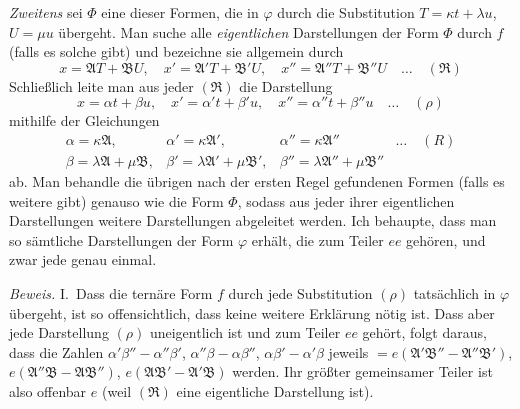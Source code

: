 \textit{Zweitens} sei $\Phi$ eine dieser Formen, die in $\varphi$ durch
die Substitution $T=\kappa t+\lambda u$, $U=\mu u$ übergeht. Man suche alle \textit{eigentlichen}
Darstellungen der Form $\Phi$ durch $f$ (falls es solche gibt)
und bezeichne sie allgemein durch
\[
x=\mathfrak{A}T+\mathfrak{B}U,\quad x'=\mathfrak{A}'T+\mathfrak{B}'U,\quad x''=\mathfrak{A}''T+\mathfrak{B}''U\quad\ldots\quad(\mathfrak{R})
\]
Schließlich leite man aus jeder $(\mathfrak{R})$ die Darstellung
\[
x=\alpha t+\beta u,\quad x'=\alpha't+\beta'u,\quad x''=\alpha''t+\beta''u\quad\ldots\quad(\rho)
\]
mithilfe der Gleichungen
\[
\begin{array}{llll}
\alpha=\kappa\mathfrak{A},&\alpha'=\kappa\mathfrak{A}',&\alpha''=\kappa\mathfrak{A}''&\ldots\quad(R)\\
\beta=\lambda\mathfrak{A}+\mu\mathfrak{B},&\beta'=\lambda\mathfrak{A}'+\mu\mathfrak{B}',&\beta''=\lambda\mathfrak{A}''+\mu\mathfrak{B}''&
\end{array}
\]
ab. Man behandle die übrigen nach der ersten Regel gefundenen Formen
(falls es weitere gibt) genauso wie die Form $\Phi$, sodass aus jeder
ihrer eigentlichen Darstellungen weitere Darstellungen abgeleitet werden.
Ich behaupte, dass man so sämtliche Darstellungen der Form $\varphi$
erhält, die zum Teiler $ee$ gehören, und zwar jede genau einmal.

\textit{Beweis.} I.\ Dass die ternäre Form $f$ durch jede Substitution
$(\rho)$ tatsächlich in $\varphi$ übergeht, ist so offensichtlich, dass
keine weitere Erklärung nötig ist. Dass aber jede Darstellung $(\rho)$
uneigentlich ist und zum Teiler $ee$ gehört, folgt daraus, dass die
Zahlen $\alpha'\beta''-\alpha''\beta'$, $\alpha''\beta-\alpha\beta''$, $\alpha\beta'-\alpha'\beta$ jeweils $=e(\mathfrak{A}'\mathfrak{B}''-\mathfrak{A}''\mathfrak{B}')$, $e(\mathfrak{A}''\mathfrak{B}-\mathfrak{A}\mathfrak{B}'')$, $e(\mathfrak{A}\mathfrak{B}'-\mathfrak{A}'\mathfrak{B})$
werden. Ihr größter gemeinsamer Teiler ist also offenbar $e$ (weil
$(\mathfrak{R})$ eine eigentliche Darstellung ist).

